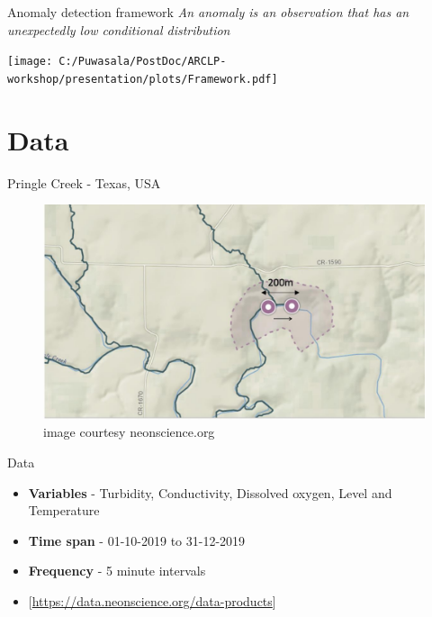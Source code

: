 \documentclass[14pt,ignorenonframetext,compress]{beamer}
\begin{document}
\begin{frame}{Anomaly detection framework}
\protect\hypertarget{anomaly-detection-framework}{}
\emph{An anomaly is an observation that has an unexpectedly low
conditional distribution}

\texttt{[image: C:/Puwasala/PostDoc/ARCLP-workshop/presentation/plots/Framework.pdf]}
\end{frame}

\hypertarget{data}{%
\section{Data}\label{data}}

\begin{frame}{Pringle Creek - Texas, USA}
\protect\hypertarget{pringle-creek---texas-usa}{}
\begin{figure}
\includegraphics[width=1\linewidth]{plots/Pringle-creek-map} \caption{image courtesy neonscience.org}\label{fig:pringle-creek-map}
\end{figure}
\end{frame}

\begin{frame}{Data}
\protect\hypertarget{data-1}{}
\begin{itemize}
\item
  \textbf{Variables} - Turbidity, Conductivity, Dissolved oxygen, Level
  and Temperature
\item
  \textbf{Time span} - 01-10-2019 to 31-12-2019
\item
  \textbf{Frequency} - 5 minute intervals
\item
  {[}\url{https://data.neonscience.org/data-products}{]}
\end{itemize}
\end{frame}
\end{document}
